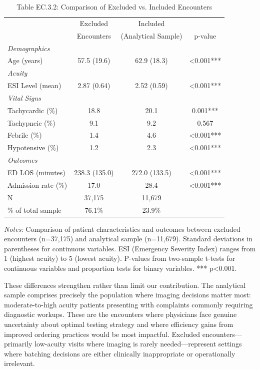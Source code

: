 \documentclass[11pt]{article}
\newcommand{\1}{\hbox{\rm 1\kern-.35em 1}}
\begin{document}
\begin{table}[t!]
\centering
\caption*{Table EC.3.2: Comparison of Excluded vs. Included Encounters}
\begin{threeparttable}
\begin{tabular}{lccc}
\toprule
& Excluded & Included & \\
& Encounters & (Analytical Sample) & p-value \\
\midrule
\textit{Demographics} \\
Age (years) & 57.5 (19.6) & 62.9 (18.3) & <0.001*** \\
\midrule
\textit{Acuity} \\
ESI Level (mean) & 2.87 (0.64) & 2.52 (0.59) & <0.001*** \\
\midrule
\textit{Vital Signs} \\
Tachycardic (\%) & 18.8 & 20.1 & 0.001*** \\
Tachypneic (\%) & 9.1 & 9.2 & 0.567 \\
Febrile (\%) & 1.4 & 4.6 & <0.001*** \\
Hypotensive (\%) & 1.2 & 2.3 & <0.001*** \\
\midrule
\textit{Outcomes} \\
ED LOS (minutes) & 238.3 (135.0) & 272.0 (133.5) & <0.001*** \\
Admission rate (\%) & 17.0 & 28.4 & <0.001*** \\
\midrule
N & 37,175 & 11,679 & \\
\% of total sample & 76.1\% & 23.9\% & \\
\bottomrule
\end{tabular}
\begin{tablenotes}
\footnotesize
\item \textit{Notes:} Comparison of patient characteristics and outcomes between excluded encounters (n=37,175) and analytical sample (n=11,679). Standard deviations in parentheses for continuous variables. ESI (Emergency Severity Index) ranges from 1 (highest acuity) to 5 (lowest acuity). P-values from two-sample t-tests for continuous variables and proportion tests for binary variables. *** p<0.001.
\end{tablenotes}
\end{threeparttable}
\end{table}


These differences strengthen rather than limit our contribution. The analytical sample comprises precisely the population where imaging decisions matter most: moderate-to-high acuity patients presenting with complaints commonly requiring diagnostic workups. These are the encounters where physicians face genuine uncertainty about optimal testing strategy and where efficiency gains from improved ordering practices would be most impactful. Excluded encounters---primarily low-acuity visits where imaging is rarely needed---represent settings where batching decisions are either clinically inappropriate or operationally irrelevant.
\end{document}
